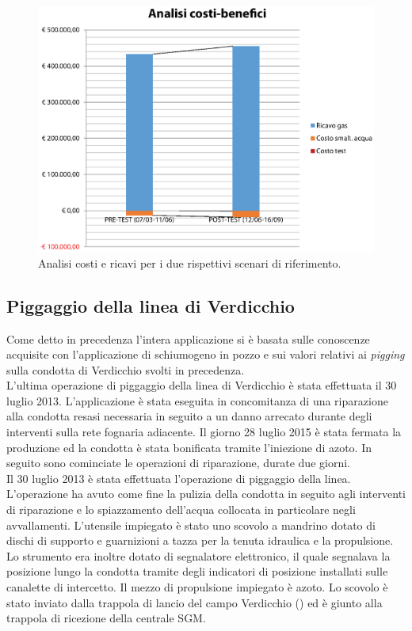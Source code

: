 \begin{figure}[htbp]
    \centering
    \includegraphics[width=\textwidth]{fig/test/graphs/costi-benefici.eps}
    \caption{Analisi costi e ricavi per i due rispettivi scenari di riferimento.} 
    \label{fig:costi-benefici}
\end{figure}


\subsection{Piggaggio della linea di Verdicchio}
Come detto in precedenza l'intera applicazione si è basata sulle conoscenze acquisite con l'applicazione di schiumogeno in pozzo e sui valori relativi ai \textit{pigging} sulla condotta di Verdicchio svolti in precedenza.\\
L'ultima operazione di piggaggio della linea di Verdicchio è stata effettuata il 30 luglio 2013. L'applicazione è stata eseguita in concomitanza di una riparazione alla condotta resasi necessaria in seguito a un danno arrecato durante degli interventi sulla rete fognaria adiacente. Il giorno 28 luglio 2015 è stata fermata la produzione ed la condotta è stata bonificata tramite l'iniezione di azoto. In seguito sono cominciate le operazioni di riparazione, durate due giorni.\\
Il 30 luglio 2013 è stata effettuata l'operazione di piggaggio della linea. L'operazione ha avuto come fine la pulizia della condotta in seguito agli interventi di riparazione e lo spiazzamento dell'acqua collocata in particolare negli avvallamenti. L'utensile impiegato è stato uno scovolo a mandrino dotato di dischi di supporto e guarnizioni a tazza per la tenuta idraulica e la propulsione. Lo strumento era inoltre dotato di segnalatore elettronico, il quale segnalava la posizione lungo la condotta tramite degli indicatori di posizione installati sulle canalette di intercetto. Il mezzo di propulsione impiegato è azoto. Lo scovolo è stato inviato dalla trappola di lancio del campo Verdicchio () ed è giunto alla trappola di ricezione della centrale SGM.

